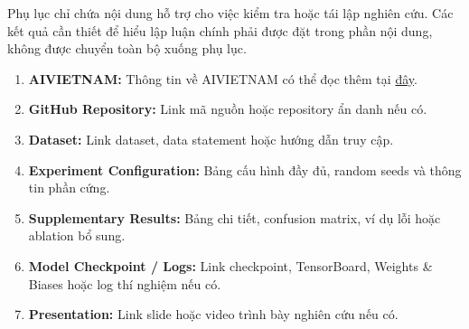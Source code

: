 \documentclass[12pt]{ai_conquer2026}
\begin{document}
\newpage
\begin{appendices}

Phụ lục chỉ chứa nội dung hỗ trợ cho việc kiểm tra hoặc tái lập nghiên cứu. Các kết quả cần thiết để hiểu lập luận chính phải được đặt trong phần nội dung, không được chuyển toàn bộ xuống phụ lục.

\begin{enumerate}
\item \textbf{AIVIETNAM:} Thông tin về AIVIETNAM có thể đọc thêm tại \href{https://aivietnam.edu.vn/}{đây}.
\item \textbf{GitHub Repository:} Link mã nguồn hoặc repository ẩn danh nếu có.
\item \textbf{Dataset:} Link dataset, data statement hoặc hướng dẫn truy cập.
\item \textbf{Experiment Configuration:} Bảng cấu hình đầy đủ, random seeds và thông tin phần cứng.
\item \textbf{Supplementary Results:} Bảng chi tiết, confusion matrix, ví dụ lỗi hoặc ablation bổ sung.
\item \textbf{Model Checkpoint / Logs:} Link checkpoint, TensorBoard, Weights \& Biases hoặc log thí nghiệm nếu có.
\item \textbf{Presentation:} Link slide hoặc video trình bày nghiên cứu nếu có.
\end{enumerate}

\end{appendices}
\end{document}
